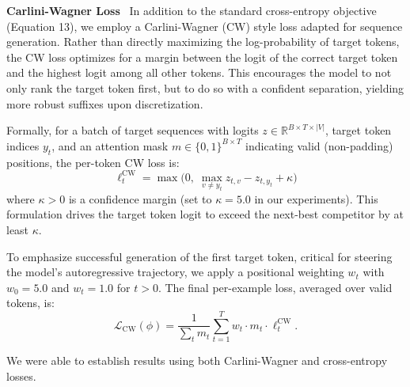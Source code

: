 \documentclass[letterpaper]{article} %
\begin{document}
\textbf{Carlini-Wagner Loss} \, In addition to the standard cross-entropy objective (Equation 13), we employ a Carlini-Wagner (CW) style loss adapted for sequence generation\citep{carlini2017evaluatingrobustnessneural}. Rather than directly maximizing the log-probability of target tokens, the CW loss optimizes for a margin between the logit of the correct target token and the highest logit among all other tokens. This encourages the model to not only rank the target token first, but to do so with a confident separation, yielding more robust suffixes upon discretization.

Formally, for a batch of target sequences with logits $z \in \mathbb{R}^{B \times T \times |V|}$, target token indices $y_t$, and an attention mask $m \in \{0,1\}^{B \times T}$ indicating valid (non-padding) positions, the per-token CW loss is:
\begin{equation}
    \ell_t^{\text{CW}} = \max\!\Big(0,\; \max_{v \neq y_t} z_{t,v} - z_{t,y_t} + \kappa\Big)
\end{equation}
where $\kappa > 0$ is a confidence margin (set to $\kappa = 5.0$ in our experiments). This formulation drives the target token logit to exceed the next-best competitor by at least $\kappa$.

To emphasize successful generation of the first target token, critical for steering the model's autoregressive trajectory, we apply a positional weighting $w_t$ with $w_0 = 5.0$ and $w_t = 1.0$ for $t > 0$. The final per-example loss, averaged over valid tokens, is:
\begin{equation}
    \mathcal{L}_{\text{CW}}(\phi) = \frac{1}{\sum_t m_t} \sum_{t=1}^{T} w_t \cdot m_t \cdot \ell_t^{\text{CW}}.
\end{equation}

We were able to establish results using both Carlini-Wagner and cross-entropy losses. 
\end{document}
